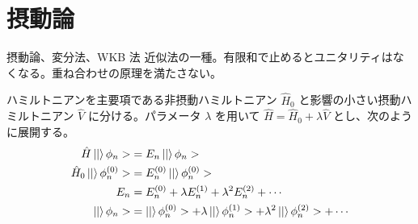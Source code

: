 \documentclass[uplatex,dvipdfmx,a4paper,11pt]{jlreq}
\numberwithin{equation}{section}
\theoremstyle{definition}
\begin{document}
\section{摂動論}
摂動論、変分法、WKB 法
近似法の一種。有限和で止めるとユニタリティはなくなる。重ね合わせの原理を満たさない。
\begin{definition}
  ハミルトニアンを主要項である非摂動ハミルトニアン $\hat{H}_0$ と影響の小さい摂動ハミルトニアン $\hat{V}$ に分ける。パラメータ $\lambda$ を用いて $\hat{H} = \hat{H}_0 + \lambda\hat{V}$ とし、次のように展開する。
  \begin{align}
    \hat{H}\ket|\phi_n>         & = E_n\ket|\phi_n>                                                                       \\
    \hat{H}_0\ket|\phi_n^{(0)}> & = E_n^{(0)}\ket|\phi_n^{(0)}>                                                           \\
    E_n                         & = E_n^{(0)} + \lambda E_n^{(1)} + \lambda^2E_n^{(2)} + \cdots                           \\
    \ket|\phi_n>                & = \ket|\phi_n^{(0)}> + \lambda\ket|\phi_n^{(1)}> + \lambda^2\ket|\phi_n^{(2)}> + \cdots
  \end{align}
\end{definition}
\end{document}
